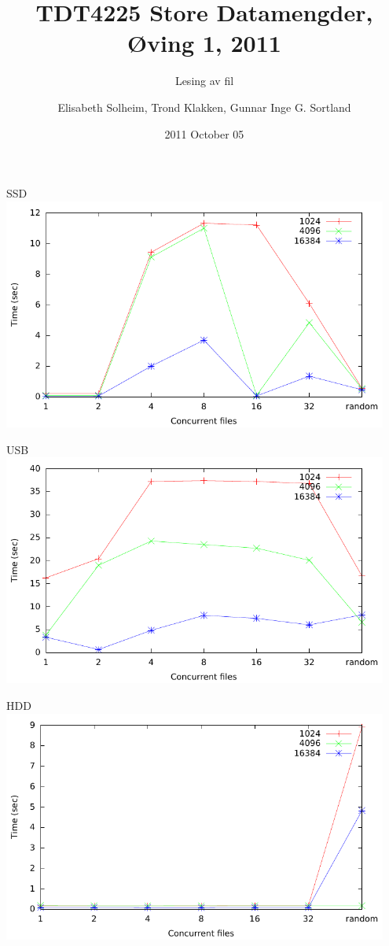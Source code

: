 \documentclass[screen]{beamer} %
\title[TDT4225 Store Datamengder, 2011] {TDT4225 Store Datamengder, Øving 1, 2011}
\subtitle{Lesing av fil}
\author[Solheim, Klakken, Sortland]{Elisabeth Solheim, Trond Klakken, \newline Gunnar Inge G. Sortland}
\institute[NTNU]{Department of Computer and Information Science}
\date{2011 October 05}
\begin{document}
\ntnutitlepage

\begin{frame}
  \begin{center}
    SSD
    \includegraphics[width=0.95\textwidth]{../report/res/result-sdd} 
  \end{center}
\end{frame}

\begin{frame}
  \begin{center}
    USB
    \includegraphics[width=0.95\textwidth]{../report/res/result-usb} 
  \end{center}
\end{frame}

\begin{frame}
  \begin{center}
    HDD
    \includegraphics[width=0.95\textwidth]{../report/res/result-hdd} 
  \end{center}
\end{frame}
\end{document}
